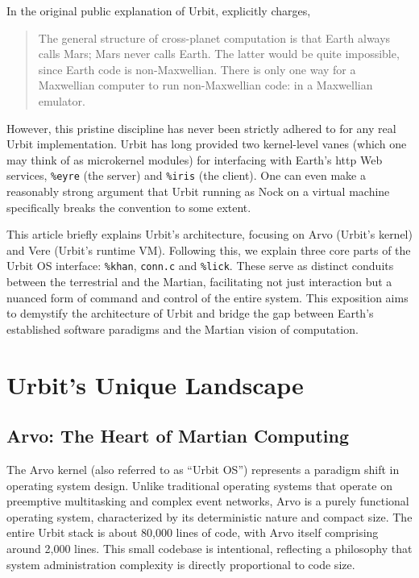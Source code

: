 \documentclass[twoside]{article}
\begin{document}
\sloppy
In the original public explanation of Urbit, \citeauthor{Yarvin2010} explicitly charges,
\begin{quote}
\sloppy
The general structure of cross-planet computation is that Earth always calls Mars; Mars never calls Earth.  The latter would be quite impossible, since Earth code is non-Maxwellian.  There is only one way for a Maxwellian computer to run non-Maxwellian code: in a Maxwellian emulator.
\end{quote}
\noindent
However, this pristine discipline has never been strictly adhered to for any real Urbit implementation.  Urbit has long provided two kernel-level vanes (which one may think of as microkernel modules) for interfacing with Earth's {\sc http} Web services, \texttt{\%eyre} (the server) and \texttt{\%iris} (the client).  One can even make a reasonably strong argument that Urbit running as Nock on a virtual machine specifically breaks the convention to some extent.

This article briefly explains Urbit's architecture, focusing on Arvo (Urbit's kernel) and Vere (Urbit's runtime VM).  Following this, we explain three core parts of the Urbit OS interface:  \texttt{\%khan}, \texttt{conn.c} and \texttt{\%lick}.  These serve as distinct conduits between the terrestrial and the Martian, facilitating not just interaction but a nuanced form of command and control of the entire system.  This exposition aims to demystify the architecture of Urbit and bridge the gap between Earth's established software paradigms and the Martian vision of computation.


\section{Urbit's Unique Landscape}

\subsection{Arvo: The Heart of Martian Computing}

The Arvo kernel (also referred to as ``Urbit OS'') represents a paradigm shift in operating system design.  Unlike traditional operating systems that operate on preemptive multitasking and complex event networks, Arvo is a purely functional operating system, characterized by its deterministic nature and compact size.  The entire Urbit stack is about 80,000 lines of code, with Arvo itself comprising around 2,000 lines.  This small codebase is intentional, reflecting a philosophy that system administration complexity is directly proportional to code size.
\end{document}
